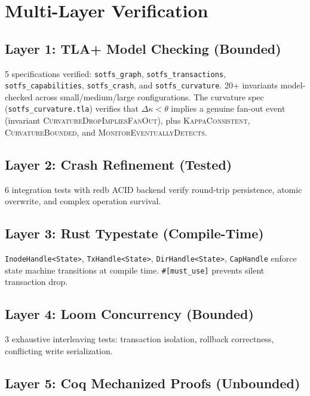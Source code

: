 \documentclass[11pt,a4paper,twoside]{report}
\theoremstyle{definition}
\begin{document}
\chapter{Multi-Layer Verification}

\section{Layer 1: TLA+ Model Checking (Bounded)}
5 specifications verified: \texttt{sotfs\_graph}, \texttt{sotfs\_transactions},
\texttt{sotfs\_capabilities}, \texttt{sotfs\_crash}, and \texttt{sotfs\_curvature}.
20+ invariants model-checked across small/medium/large configurations.
The curvature spec (\texttt{sotfs\_curvature.tla}) verifies that
$\Delta\kappa < \theta$ implies a genuine fan-out event
(invariant \textsc{CurvatureDropImpliesFanOut}), plus \textsc{KappaConsistent},
\textsc{CurvatureBounded}, and \textsc{MonitorEventuallyDetects}.

\section{Layer 2: Crash Refinement (Tested)}
6 integration tests with redb ACID backend verify round-trip persistence, atomic overwrite, and complex operation survival.

\section{Layer 3: Rust Typestate (Compile-Time)}
\texttt{InodeHandle<State>}, \texttt{TxHandle<State>}, \texttt{DirHandle<State>}, \texttt{CapHandle} enforce state machine transitions at compile time. \texttt{\#[must\_use]} prevents silent transaction drop.

\section{Layer 4: Loom Concurrency (Bounded)}
3 exhaustive interleaving tests: transaction isolation, rollback correctness, conflicting write serialization.

\section{Layer 5: Coq Mechanized Proofs (Unbounded)}
\end{document}

